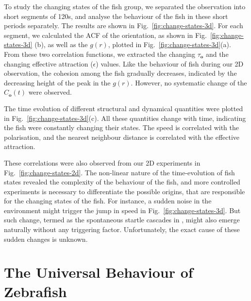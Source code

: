 \documentclass[11pt,twoside]{report}
\begin{document}
To study the changing states of the fish group, we separated the observation into short segments of 120s, and analyse the behaviour of the fish in these short periods separately. The results are shown in Fig.~\ref{fig:change-states-3d}. 
For each segment, we calculated the ACF of the orientation, as shown in Fig.~\ref{fig:change-states-3d} (b), as well as the $g(r)$, plotted in Fig.~\ref{fig:change-states-3d}(a). From these two correlation functions, we extracted the changing $\tau_\mathbf{o}$ and the changing effective attraction ($\epsilon$) values. Like the behaviour of fish during our 2D observation, the cohesion among the fish gradually decreases, indicated by the decreasing height of the peak in the $g(r)$. However, no systematic change of the $C_\mathbf{o}(t)$ were observed.

The time evolution of different structural and dynamical quantities were plotted in Fig.~\ref{fig:change-states-3d}(c). All these quantities change with time, indicating the fish were constantly changing their states.
The speed is correlated with the polarisation, and the nearest neighbour distance is correlated with the effective attraction.


These correlations were also observed from our 2D experiments in Fig.~\ref{fig:change-states-2d}. The non-linear nature of the time-evolution of fish states revealed the complexity of the behaviour of the fish, and more controlled experiments is necessary to differentiate the possible origins, that are responsible for the changing states of the fish. For instance, a sudden noise in the environment might trigger the jump in speed in Fig.~\ref{fig:change-states-3d}. But such change, termed as the spontaneous startle cascades in \cite{rosenthal2015}, might also emerge naturally without any triggering factor. Unfortunately, the exact cause of these sudden changes is unknown.



\section{The Universal Behaviour of Zebrafish}
\label{section:universal}
\end{document}
